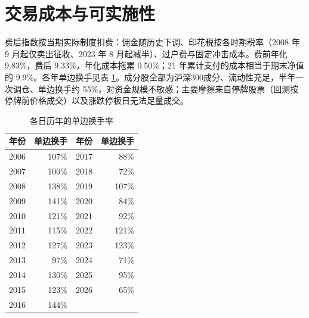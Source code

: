\documentclass[11pt,a4paper]{article}
\begin{document}
\section{交易成本与可实施性}\label{sec:cost}
费后指数按当期实际制度扣费：佣金随历史下调、印花税按各时期税率（2008 年 9 月起仅卖出征收、2023 年 8 月起减半）、过户费与固定冲击成本。费前年化 9.83\%，费后 9.33\%，年化成本拖累 0.50\%；21 年累计支付的成本相当于期末净值的 9.9\%。各年单边换手见表 \ref{tab:turnover}。成分股全部为沪深300成分、流动性充足，半年一次调仓、单边换手约 55\%，对资金规模不敏感；主要摩擦来自停牌股票（回测按停牌前价格成交）以及涨跌停板日无法足量成交。
\begin{table}[!htbp]
\centering
\small
\caption{各日历年的单边换手率}\label{tab:turnover}
\begin{tabular}{@{}lrlr@{}}
\toprule
年份 & 单边换手 & 年份  & 单边换手  \\
\midrule
2006 & 107\% & 2017 & 88\% \\
2007 & 100\% & 2018 & 72\% \\
2008 & 138\% & 2019 & 107\% \\
2009 & 141\% & 2020 & 84\% \\
2010 & 121\% & 2021 & 92\% \\
2011 & 115\% & 2022 & 121\% \\
2012 & 127\% & 2023 & 123\% \\
2013 & 97\% & 2024 & 71\% \\
2014 & 130\% & 2025 & 95\% \\
2015 & 123\% & 2026 & 65\% \\
2016 & 144\% &  &  \\
\bottomrule
\end{tabular}
\end{table}
\end{document}
